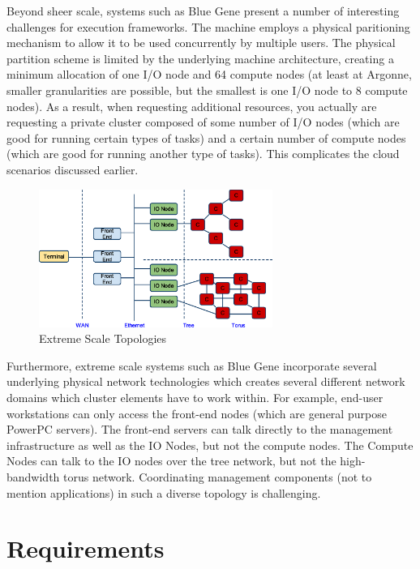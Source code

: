 \documentclass{sig-alternate}
\begin{document}
Beyond sheer scale, systems such as Blue Gene present a number of 
interesting challenges for execution frameworks.  The machine employs
a physical paritioning mechanism to allow it to be used concurrently
by multiple users.  The physical partition scheme is limited by the
underlying machine architecture, creating a minimum allocation of one
I/O node and 64 compute nodes (at least at Argonne, smaller granularities
are possible, but the smallest is one I/O node to 8 compute nodes).
As a result, when requesting additional resources, you actually are
requesting a private cluster composed of some number of I/O nodes (which
are good for running certain types of tasks) and a certain number of
compute nodes (which are good for running another type of tasks).  This
complicates the cloud scenarios discussed earlier.

\begin{figure}[h]
\begin{center}
\includegraphics[width=3in, keepaspectratio]{bgp-topology.eps}
\end{center}
\caption{Extreme Scale Topologies}
\label{fig:bgp}
\end{figure}

Furthermore, extreme scale systems such as Blue Gene incorporate several
underlying physical network technologies which creates several different
network domains which cluster elements have to work within.  For example,
end-user workstations can only access the front-end nodes (which are
general purpose PowerPC servers).  The front-end servers can talk directly
to the management infrastructure as well as the IO Nodes, but not the
compute nodes.  The Compute Nodes can talk to the IO nodes over the tree
network, but not the high-bandwidth torus network.  Coordinating management
components (not to mention applications) in such a diverse topology is
challenging.

\section{Requirements}
\end{document}
